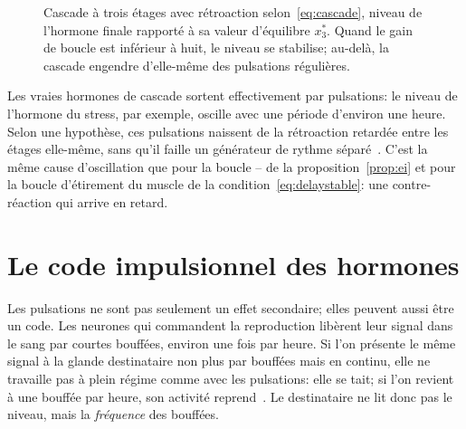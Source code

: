 \begin{figure}[t]
\centering
{}
\caption{Cascade à trois étages avec rétroaction selon~\eqref{eq:cascade}, niveau de l'hormone finale rapporté à sa valeur d'équilibre $x_3^*$. Quand le gain de boucle est inférieur à huit, le niveau se stabilise; au-delà, la cascade engendre d'elle-même des pulsations régulières.}
\label{fig:cascade}
\end{figure}

Les vraies hormones de cascade sortent effectivement par pulsations: le niveau de l'hormone du stress, par exemple, oscille avec une période d'environ une heure. Selon une hypothèse, ces pulsations naissent de la rétroaction retardée entre les étages elle-même, sans qu'il faille un générateur de rythme séparé~\cite{Walker2010}. C'est la même cause d'oscillation que pour la boucle -- de la proposition~\ref{prop:ei} et pour la boucle d'étirement du muscle de la condition~\eqref{eq:delaystable}: une contre-réaction qui arrive en retard.

\section{Le code impulsionnel des hormones}

Les pulsations ne sont pas seulement un effet secondaire; elles peuvent aussi être un code. Les neurones qui commandent la reproduction libèrent leur signal dans le sang par courtes bouffées, environ une fois par heure. Si l'on présente le même signal à la glande destinataire non plus par bouffées mais en continu, elle ne travaille pas à plein régime comme avec les pulsations: elle se tait; si l'on revient à une bouffée par heure, son activité reprend~\cite{Belchetz1978}. Le destinataire ne lit donc pas le niveau, mais la \emph{fréquence} des bouffées.

